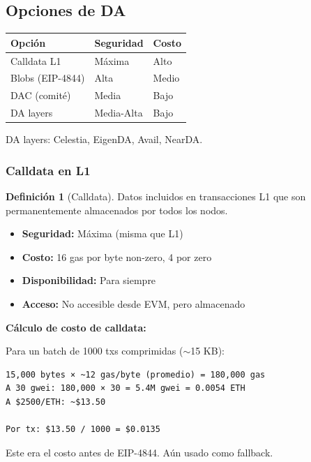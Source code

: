 \documentclass[11pt,a4paper,twoside,openright]{book}
\theoremstyle{definition}
\newtheorem{definition}{Definición}[chapter]
\theoremstyle{plain}
\theoremstyle{remark}
\begin{document}
\subsection{Opciones de DA}

\begin{table}[htbp]
\centering
\begin{tabular}{lll}
\toprule
\textbf{Opción} & \textbf{Seguridad} & \textbf{Costo} \\
\midrule
Calldata L1 & Máxima & Alto \\
Blobs (EIP-4844) & Alta & Medio \\
DAC (comité) & Media & Bajo \\
DA layers & Media-Alta & Bajo \\
\bottomrule
\end{tabular}
\end{table}

DA layers: Celestia, EigenDA, Avail, NearDA.

\subsubsection{Calldata en L1}

\begin{definition}[Calldata]
Datos incluidos en transacciones L1 que son permanentemente almacenados por todos los nodos.
\end{definition}

\begin{itemize}
    \item \textbf{Seguridad:} Máxima (misma que L1)
    \item \textbf{Costo:} 16 gas por byte non-zero, 4 por zero
    \item \textbf{Disponibilidad:} Para siempre
    \item \textbf{Acceso:} No accesible desde EVM, pero almacenado
\end{itemize}

\begin{mathnote}
\textbf{Cálculo de costo de calldata:}

Para un batch de 1000 txs comprimidas ($\sim$15 KB):
\begin{verbatim}
15,000 bytes × ~12 gas/byte (promedio) = 180,000 gas
A 30 gwei: 180,000 × 30 = 5.4M gwei = 0.0054 ETH
A $2500/ETH: ~$13.50

Por tx: $13.50 / 1000 = $0.0135
\end{verbatim}

Este era el costo antes de EIP-4844. Aún usado como fallback.
\end{mathnote}
\end{document}
